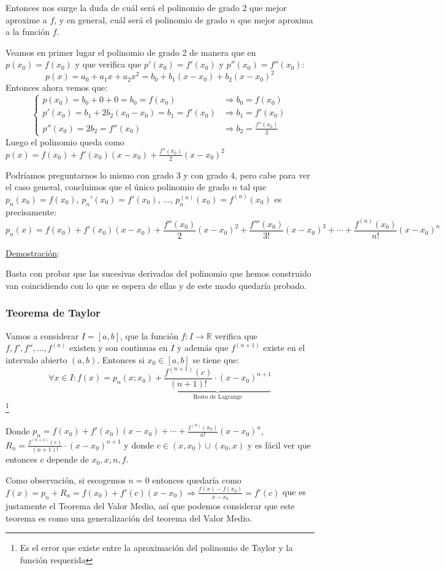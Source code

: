 \documentclass[10pt,a4paper,openright]{book}
\begin{document}
Entonces nos surge la duda de cuál será el polinomio de grado 2 que mejor aproxime a $f$, y en general, cuál será el polinomio de grado $n$ que mejor aproxima a la función $f$.

Veamos en primer lugar el polinomio de grado 2 de manera que en $p(x_0)=f(x_0)$ y que verifica que $p'(x_0)=f'(x_0)$ y $p''(x_0)=f''(x_0)$:
$$p(x)=a_0+a_1x+a_2x^2=b_0+b_1(x-x_0)+b_2(x-x_0)^2$$
Entonces ahora vemos que:
$$\begin{cases} p(x_0)=b_0+0+0=b_0=f(x_0)&\Rightarrow b_0=f(x_0)\\
p'(x_0)=b_1+2b_2(x_0-x_0)=b_1=f'(x_0)&\Rightarrow b_1=f'(x_0)\\
p''(x_0)=2b_2=f''(x_0)&\Rightarrow b_2= \frac{f''(x_0)}{2}\end{cases}$$
Luego el polinomio queda como $p(x)=f(x_0)+f'(x_0)(x-x_0)+\frac{f''(x_0)}{2}(x-x_0)^2$

Podríamos preguntarnos lo mismo con grado $3$ y con grado $4$, pero cabe para ver el caso general, concluimos que el único polinomio de grado $n$ tal que $p_n(x_0)=f(x_0)$, $p_n'(x_0)=f'(x_0)$, ..., $p_n^{(n)}(x_0)=f^{(n)}(x_0)$ es precisamente:
$$p_n(x)=f(x_0)+f'(x_0)(x-x_0)+\frac{f''(x_0)}{2}(x-x_0)^2+\frac{f'''(x_0)}{3!}(x-x_0)^3+ \cdots +\frac{f^{(n)}(x_0)}{n!}(x-x_0)^n$$

\underline{Demostración}:

Basta con probar que las sucesivas derivadas del polinomio que hemos construido van coincidiendo con lo que se espera de ellas y de este modo quedaría probado.

\subsubsection*{Teorema de Taylor}
Vamos a considerar $I=[a,b]$, que la función $f:I\rightarrow \mathbb R$ verifica que $f,f',f'', ..., f^{(n)}$ existen y son continuas en $I$ y además que $f^{(n+1)}$ existe en el intervalo abierto $(a,b)$. Entonces si $x_0\in [a,b]$ se tiene que:
$$\forall x\in I: f(x)=p_n(x; x_0)+\underbrace{\frac{f^{(n+1)}(c)}{(n+1)!}\cdot (x-x_0)^{n+1}}_{\mbox{Resto de Lagrange}}$$
\footnote{Es el error que existe entre la aproximación del polinomio de Taylor y la función requerida}

Donde $p_n=f(x_0)+f'(x_0)(x-x_0)+\cdots + \frac{f^{(n)}(x_0)}{n!}(x-x_0)^n$, $R_n=\frac{f^{(n+1)}(c)}{(n+1)!}\cdot (x-x_0)^{n+1}$ y donde $c\in (x,x_0)\cup (x_0, x)$ y es fácil ver que entonces $c$ depende de $x_0, x, n, f$.

Como observación, si escogemos $n=0$ entonces quedaría como $f(x)=p_n+R_n=f(x_0)+f'(c)(x-x_0)\Rightarrow \frac{f(x)-f(x_0)}{x-x_0}=f'(c)$ que es justamente el Teorema del Valor Medio, así que podemos considerar que este teorema es como una generalización del teorema del Valor Medio.
\end{document}
